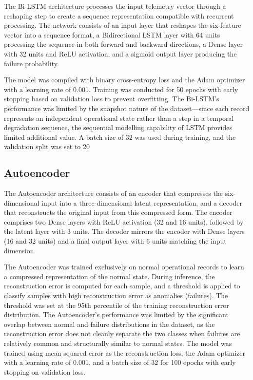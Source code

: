 \documentclass[12pt,letterpaper]{report}
\begin{document}
The Bi-LSTM architecture processes the input telemetry vector through a reshaping step to create a sequence representation compatible with recurrent processing. The network consists of an input layer that reshapes the six-feature vector into a sequence format, a Bidirectional LSTM layer with 64 units processing the sequence in both forward and backward directions, a Dense layer with 32 units and ReLU activation, and a sigmoid output layer producing the failure probability.

The model was compiled with binary cross-entropy loss and the Adam optimizer with a learning rate of 0.001. Training was conducted for 50 epochs with early stopping based on validation loss to prevent overfitting. The Bi-LSTM's performance was limited by the snapshot nature of the dataset---since each record represents an independent operational state rather than a step in a temporal degradation sequence, the sequential modelling capability of LSTM provides limited additional value. A batch size of 32 was used during training, and the validation split was set to 20%

\subsection{Autoencoder}

The Autoencoder architecture consists of an encoder that compresses the six-dimensional input into a three-dimensional latent representation, and a decoder that reconstructs the original input from this compressed form. The encoder comprises two Dense layers with ReLU activation (32 and 16 units), followed by the latent layer with 3 units. The decoder mirrors the encoder with Dense layers (16 and 32 units) and a final output layer with 6 units matching the input dimension.

The Autoencoder was trained exclusively on normal operational records to learn a compressed representation of the normal state. During inference, the reconstruction error is computed for each sample, and a threshold is applied to classify samples with high reconstruction error as anomalies (failures). The threshold was set at the 95th percentile of the training reconstruction error distribution. The Autoencoder's performance was limited by the significant overlap between normal and failure distributions in the dataset, as the reconstruction error does not cleanly separate the two classes when failures are relatively common and structurally similar to normal states. The model was trained using mean squared error as the reconstruction loss, the Adam optimizer with a learning rate of 0.001, and a batch size of 32 for 100 epochs with early stopping on validation loss.
\end{document}
